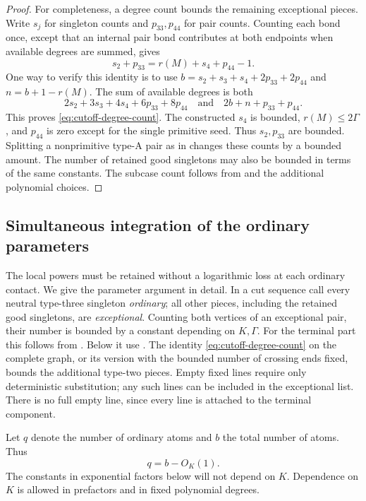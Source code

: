 \begin{proof}
For completeness, a degree count bounds the remaining exceptional
pieces.  Write \(s_j\) for singleton counts and \(p_{33},p_{44}\)
for pair counts.  Counting each bond once, except that an internal
pair bond contributes at both endpoints when available degrees
are summed, gives
\begin{equation}\label{eq:cutoff-degree-count}
 s_2+p_{33}=r(M)+s_4+p_{44}-1 .
\end{equation}
One way to verify this identity is to use
\(b=s_2+s_3+s_4+2p_{33}+2p_{44}\) and
\(n=b+1-r(M)\).  The sum of available degrees is both
\[
 2s_2+3s_3+4s_4+6p_{33}+8p_{44}
 \quad\text{and}\quad
 2b+n+p_{33}+p_{44}.
\]
This proves \eqref{eq:cutoff-degree-count}.
The constructed \(s_4\) is bounded, \(r(M)\leq2\Gamma\),
and \(p_{44}\) is zero except for the single primitive seed.
Thus \(s_2,p_{33}\) are bounded.  Splitting a nonprimitive
type-A pair as in  changes these counts
by a bounded amount.  The number of retained good singletons
may also be bounded in terms of the same constants.
The subcase count follows from
 and the additional polynomial choices.
\end{proof}

\subsection{Simultaneous integration of the ordinary parameters}

The local powers must be retained without a logarithmic loss at each
ordinary contact.  We give the parameter argument in detail.  In a
cut sequence call every neutral type-three singleton \emph{ordinary};
all other pieces, including the retained good singletons, are
\emph{exceptional}.  Counting both vertices of an exceptional pair,
their number is bounded by a constant depending on \(K,\Gamma\).
For the terminal part this follows from
.  Below it use
.  The identity
\eqref{eq:cutoff-degree-count} on the complete graph, or its version
with the bounded number of crossing ends fixed, bounds the additional
type-two pieces.  Empty fixed lines require only deterministic
substitution; any such lines can be included in the exceptional list.
There is no full empty line, since every line is attached to the
terminal component.

Let \(q\) denote the number of ordinary atoms and \(b\) the total
number of atoms.  Thus
\begin{equation}\label{eq:cutoff-ordinary-count}
 q=b-O_K(1).
\end{equation}
The constants in exponential factors below will not depend on \(K\).
Dependence on \(K\) is allowed in prefactors and in fixed polynomial
degrees.


